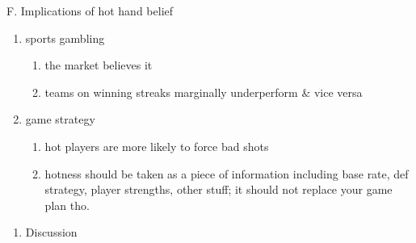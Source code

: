 \documentclass[12pt,twoside]{dukestatscithesis}
\providecommand{\tightlist}{%
  \setlength{\itemsep}{0pt}\setlength{\parskip}{0pt}}
\theoremstyle{definition}
\theoremstyle{definition}
\theoremstyle{definition}
\theoremstyle{remark}
\begin{document}
F. Implications of hot hand belief
\begin{enumerate}
\def\labelenumi{\arabic{enumi}.}
\tightlist
\item
  sports gambling
  \begin{enumerate}
  \def\labelenumii{\alph{enumii}.}
  \tightlist
  \item
    the market believes it
  \item
    teams on winning streaks marginally underperform \& vice versa
  \end{enumerate}
\item
  game strategy
  \begin{enumerate}
  \def\labelenumii{\alph{enumii}.}
  \tightlist
  \item
    hot players are more likely to force bad shots
  \item
    hotness should be taken as a piece of information including base
    rate, def strategy, player strengths, other stuff; it should not
    replace your game plan tho.
  \end{enumerate}
\end{enumerate}
\begin{enumerate}
\def\labelenumi{\Alph{enumi}.}
\setcounter{enumi}{6}
\tightlist
\item
  Discussion
\end{enumerate}
\end{document}
